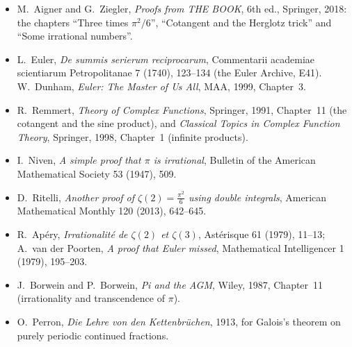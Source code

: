 \begin{itemize}
\item M.~Aigner and G.~Ziegler, \emph{Proofs from THE BOOK}, 6th ed., Springer, 2018: the chapters ``Three times $\pi^2/6$'',
``Cotangent and the Herglotz trick'' and ``Some irrational numbers''.
\item L.~Euler, \emph{De summis serierum reciprocarum}, Commentarii academiae scientiarum Petropolitanae 7 (1740), 123--134
(the Euler Archive, E41). W.~Dunham, \emph{Euler: The Master of Us All}, MAA, 1999, Chapter~3.
\item R.~Remmert, \emph{Theory of Complex Functions}, Springer, 1991, Chapter~11 (the cotangent and the sine product), and
\emph{Classical Topics in Complex Function Theory}, Springer, 1998, Chapter~1 (infinite products).
\item I.~Niven, \emph{A simple proof that $\pi$ is irrational}, Bulletin of the American Mathematical Society 53 (1947), 509.
\item D.~Ritelli, \emph{Another proof of $\zeta(2)=\frac{\pi^2}6$ using double integrals}, American Mathematical Monthly 120
(2013), 642--645.
\item R.~Ap\'ery, \emph{Irrationalit\'e de $\zeta(2)$ et $\zeta(3)$}, Ast\'erisque 61 (1979), 11--13; A.~van der Poorten, \emph{A proof that
Euler missed}, Mathematical Intelligencer 1 (1979), 195--203.
\item J.~Borwein and P.~Borwein, \emph{Pi and the AGM}, Wiley, 1987, Chapter~11 (irrationality and transcendence of $\pi$).
\item O.~Perron, \emph{Die Lehre von den Kettenbr\"uchen}, 1913, for Galois's theorem on purely periodic continued fractions.
\end{itemize}
